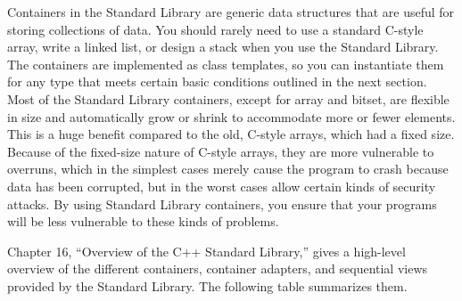
Containers in the Standard Library are generic data structures that are useful for storing collections of data. You should rarely need to use a standard C-style array, write a linked list, or design a stack when you use the Standard Library. The containers are implemented as class templates, so you can instantiate them for any type that meets certain basic conditions outlined in the next section. Most of the Standard Library containers, except for array and bitset, are flexible in size and automatically grow or shrink to accommodate more or fewer elements. This is a huge benefit compared to the old, C-style arrays, which had a fixed size. Because of the fixed-size nature of C-style arrays, they are more vulnerable to overruns, which in the simplest cases merely cause the program to crash because data has been corrupted, but in the worst cases allow certain kinds of security attacks. By using Standard Library containers, you ensure that your programs will be less vulnerable to these kinds of problems.

Chapter 16, “Overview of the C++ Standard Library,” gives a high-level overview of the different containers, container adapters, and sequential views provided by the Standard Library. The following table summarizes them.

